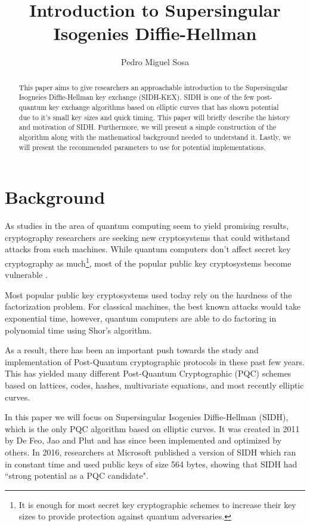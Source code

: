 \documentclass[10pt,twocolumn]{article} %
\title{Introduction to Supersingular Isogenies Diffie-Hellman}
\author{Pedro Miguel Sosa}
\begin{document}
\maketitle

\begin{abstract}
This paper aims to give researchers an approachable introduction to the Supersingular Isogneies Diffie-Hellman key exchange (SIDH-KEX). SIDH is one of the few post-quantum key exchange algorithms based on elliptic curves that has shown potential due to it's small key sizes and quick timing. This paper will briefly describe the history and motivation of SIDH. Furthermore, we will present a simple construction of the algorithm along with the mathematical background needed to understand it. Lastly, we will present the recommended parameters to use for potential implementations.
\end{abstract}

\section{Background}
As studies in the area of quantum computing seem to yield promising results, cryptography researchers are seeking new cryptosystems that could withstand attacks from such machines. While quantum computers don't affect secret key cryptography as much\footnote{It is enough for most secret key cryptographic schemes to increase their key sizes to provide protection against quantum adversaries.}, most of the popular public key cryptosystems become vulnerable \cite{bernstein2009introduction}. 
\par Most popular public key cryptosystems used today rely on the hardness of the factorization problem. For classical machines, the best known attacks would take exponential time, however, quantum computers are able to do factoring in polynomial time using Shor's algorithm.
\par As a result, there has been an important push towards the study and implementation of Post-Quantum cryptographic protocols in these past few years. This has yielded many different Post-Quantum Cryptographic (PQC) schemes based on lattices, codes, hashes, multivariate equations, and most recently elliptic curves.
\par In this paper we will focus on Supersingular Isogenies Diffie-Hellman (SIDH), which is the only PQC algorithm based on elliptic curves. It was created in 2011 by De Feo, Jao and Plut \cite{Jao2011} and has since been implemented and optimized by others. In 2016, researchers at Microsoft published a version of SIDH which ran in constant time and used public keys of size 564 bytes, showing that SIDH had ``strong potential as a PQC candidate"\cite{costello2016}.
\end{document}

